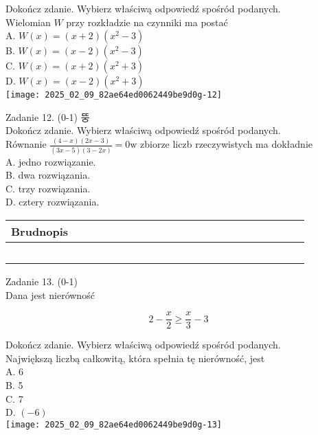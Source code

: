 \documentclass[10pt]{article}
\begin{document}
Dokończ zdanie. Wybierz właściwą odpowiedź spośród podanych.\\
Wielomian \(W\) przy rozkładzie na czynniki ma postać\\
A. \(W(x)=(x+2)\left(x^{2}-3\right)\)\\
B. \(W(x)=(x-2)\left(x^{2}-3\right)\)\\
C. \(W(x)=(x+2)\left(x^{2}+3\right)\)\\
D. \(W(x)=(x-2)\left(x^{2}+3\right)\)\\
\texttt{[image: 2025\_02\_09\_82ae64ed0062449be9d0g-12]}

Zadanie 12. (0-1) 뚱\\
Dokończ zdanie. Wybierz właściwą odpowiedź spośród podanych.\\
Równanie \(\frac{(4-x)(2 x-3)}{(3 x-5)(3-2 x)}=0 \mathrm{w}\) zbiorze liczb rzeczywistych ma dokładnie\\
A. jedno rozwiązanie.\\
B. dwa rozwiązania.\\
C. trzy rozwiązania.\\
D. cztery rozwiązania.

\begin{center}
\begin{tabular}{|c|c|c|c|c|c|c|c|c|c|c|c|c|c|c|c|c|c|c|c|c|c|c|c|c|}
\hline
\multicolumn{4}{|l|}{Brudnopis} &  &  &  &  &  &  &  &  &  &  &  &  &  &  &  &  &  &  &  &  &  \\
\hline
 &  &  &  &  &  &  &  &  &  &  &  &  &  &  &  &  &  &  &  &  &  &  &  &  \\
\hline
 &  &  &  &  &  &  &  &  &  &  &  &  &  &  &  &  &  &  &  &  &  &  &  &  \\
\hline
 &  &  &  &  &  &  &  &  &  &  &  &  &  &  &  &  &  &  &  &  &  &  &  &  \\
\hline
 &  &  &  &  &  &  &  &  &  &  &  &  &  &  &  &  &  &  &  &  &  &  &  &  \\
\hline
 &  &  &  &  &  &  &  &  &  &  &  &  &  &  &  &  &  &  &  &  &  &  &  &  \\
\hline
\end{tabular}
\end{center}

Zadanie 13. (0-1)\\
Dana jest nierówność

\[
2-\frac{x}{2} \geq \frac{x}{3}-3
\]

Dokończ zdanie. Wybierz właściwą odpowiedź spośród podanych.\\
Największą liczbą całkowitą, która spełnia tę nierówność, jest\\
A. 6\\
B. 5\\
C. 7\\
D. \((-6)\)\\
\texttt{[image: 2025\_02\_09\_82ae64ed0062449be9d0g-13]}
\end{document}
